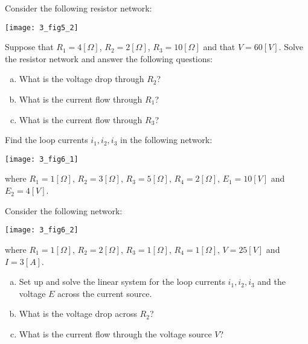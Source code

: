 \begin{problem}
\label{2009_a5_5}
Consider the following resistor network:

\begin{center}
\texttt{[image: 3\_fig5\_2]}
\end{center}
Suppose that $R_1=4[\Omega]$, $R_2=2[\Omega]$, $R_3=10[\Omega]$ and that $V=60[V]$. Solve the resistor network and answer the following questions:

\begin{enumerate}[a)]
\item What is the voltage drop through $R_2$?
\item What is the current flow through $R_1$?
\item What is the current flow through $R_3$?
\end{enumerate}
\end{problem}

\begin{problem}
\label{2009_a6_1}
Find the loop currents $i_1,i_2,i_3$ in the following network:

\centerline{\texttt{[image: 3\_fig6\_1]}}


where $R_1=1[\Omega]$, $R_2=3[\Omega]$, $R_3=5[\Omega]$, $R_4=2[\Omega]$, $E_1=10[V]$ and $E_2=4[V]$.
\end{problem}

\begin{problem}
\label{2009_a6_2}
Consider the following network:

\centerline{\texttt{[image: 3\_fig6\_2]}}

where $R_1=1[\Omega]$, $R_2=2[\Omega]$, $R_3= 1 [\Omega]$, $R_4=1 [\Omega]$,
$V=25[V]$ and $I=3[A]$.
\begin{enumerate}[a)]
\item Set up and solve the linear system for the
loop currents $i_1,i_2,i_3$ and the voltage $E$ across the current source.
\item What is the voltage drop across $R_2$?
\item What is the current flow through the voltage source $V$?
\end{enumerate} 
\end{problem}

%
%

